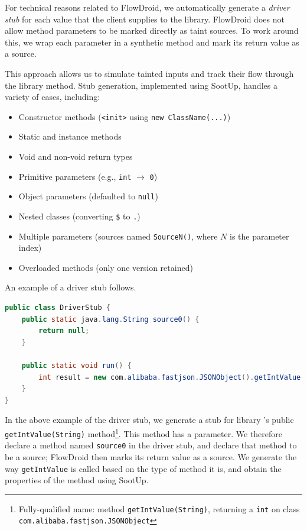 For technical reasons related to FlowDroid, we automatically generate a \textit{driver stub} for each value that the client supplies to the library. FlowDroid does not allow method parameters to be marked directly as taint sources. To work around this, we wrap each parameter in a synthetic method and mark its return value as a source.

This approach allows us to simulate tainted inputs and track their flow through the library method. Stub generation, implemented using SootUp, handles a variety of cases, including:
\begin{itemize}
  \item Constructor methods (\texttt{<init>} using \texttt{new ClassName(...)})
  \item Static and instance methods
  \item Void and non-void return types
  \item Primitive parameters (e.g., \texttt{int} $\rightarrow$ \texttt{0})
  \item Object parameters (defaulted to \texttt{null})
  \item Nested classes (converting \texttt{\$} to \texttt{.})
  \item Multiple parameters (sources named \texttt{SourceN()}, where $N$ is the parameter index)
  \item Overloaded methods (only one version retained)
\end{itemize}

An example of a driver stub follows.
\begin{lstlisting}[language=Java]
public class DriverStub {
    public static java.lang.String source0() {
        return null;
    }

    public static void run() {
        int result = new com.alibaba.fastjson.JSONObject().getIntValue(source0());
    }
}
\end{lstlisting}

In the above example of the driver stub, we generate a stub for library \texttt{}'s public \texttt{getIntValue(String)} method\footnote{Fully-qualified name: method \texttt{getIntValue(String)}, returning a \texttt{int} on class \texttt{com.alibaba.fastjson.JSONObject}}. This method has a \texttt{} parameter. We therefore declare a method named \texttt{source0} in the driver stub, and declare that method to be a source; FlowDroid then marks its return value as a source. We generate the way \texttt{getIntValue} is called based on the type of method it is, and obtain the properties of the method using SootUp.


